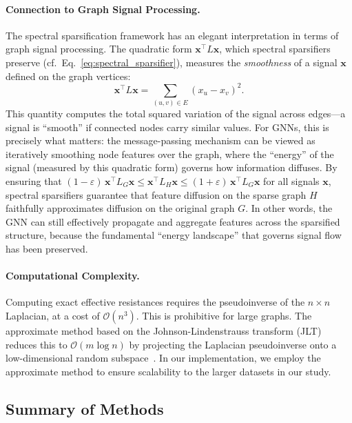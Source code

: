 \documentclass[conference]{IEEEtran}
\begin{document}
\paragraph{Connection to Graph Signal Processing.} The spectral sparsification framework has an elegant interpretation in terms of graph signal processing. The quadratic form $\mathbf{x}^\top L \mathbf{x}$, which spectral sparsifiers preserve (cf.\ Eq.~\eqref{eq:spectral_sparsifier}), measures the \emph{smoothness} of a signal $\mathbf{x}$ defined on the graph vertices:
\begin{equation}
    \mathbf{x}^\top L \mathbf{x} = \sum_{(u,v) \in E} (x_u - x_v)^2.
    \label{eq:signal_smoothness}
\end{equation}
This quantity computes the total squared variation of the signal across edges---a signal is ``smooth'' if connected nodes carry similar values. For GNNs, this is precisely what matters: the message-passing mechanism can be viewed as iteratively smoothing node features over the graph, where the ``energy'' of the signal (measured by this quadratic form) governs how information diffuses. By ensuring that $(1 - \varepsilon) \, \mathbf{x}^\top L_G \mathbf{x} \leq \mathbf{x}^\top L_H \mathbf{x} \leq (1 + \varepsilon) \, \mathbf{x}^\top L_G \mathbf{x}$ for all signals $\mathbf{x}$, spectral sparsifiers guarantee that feature diffusion on the sparse graph $H$ faithfully approximates diffusion on the original graph $G$. In other words, the GNN can still effectively propagate and aggregate features across the sparsified structure, because the fundamental ``energy landscape'' that governs signal flow has been preserved.

\paragraph{Computational Complexity.} Computing exact effective resistances requires the pseudoinverse of the $n \times n$ Laplacian, at a cost of $\mathcal{O}(n^3)$. This is prohibitive for large graphs. The approximate method based on the Johnson-Lindenstrauss transform (JLT) reduces this to $\mathcal{O}(m \log n)$ by projecting the Laplacian pseudoinverse onto a low-dimensional random subspace~\cite{spielman2011}. In our implementation, we employ the approximate method to ensure scalability to the larger datasets in our study.

\subsection{Summary of Methods}
\end{document}
